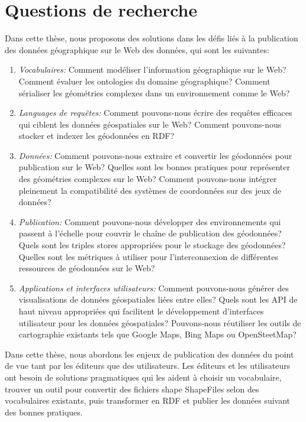 \documentclass[a4paper,11pt,twoside]{report}
\begin{document}
\chapter*{Questions de recherche}

Dans cette thèse, nous proposons des solutions dans les défis liés à la publication des données géographique sur le Web des données, qui sont les suivantes: 

\begin{enumerate}

\item \textit{Vocabulaires:} Comment modéliser l'information géographique sur le Web? Comment évaluer les ontologies du domaine géographique? Comment sérialiser les géométries complexes dans un environnement comme le Web? 
\item \textit{Languages de requêtes:} Comment pouvons-nous écrire des requêtes efficaces qui ciblent les données géospatiales sur le Web? Comment pouvons-nous stocker et indexer les géodonnées en RDF?

\item \textit{Données:} Comment pouvons-nous extraire et convertir les géodonnées pour publication sur le Web? Quelles sont les bonnes pratiques pour représenter des géométries complexes sur le Web? Comment pouvons-nous intégrer pleinement la compatibilité des systèmes de coordonnées  sur des jeux de données?

\item \textit{Publication:} Comment pouvons-nous développer des environnements qui passent à l'échelle pour couvrir le chaîne de publication des géodonnées? Quels sont les triples stores appropriées pour le stockage des géodonnées? Quelles sont les métriques à utiliser pour l'interconnexion de différentes ressources de géodonnées sur le Web? 

\item \textit{Applications et interfaces utilisateurs:} 
Comment pouvons-nous générer des visualisations de données géospatiales liées entre elles? Quels sont les API de haut niveau appropriées qui facilitent le développement d'interfaces utilisateur pour les données géospatiales? Pouvons-nous réutiliser les outils de cartographie existants tels que Google Maps, Bing Maps ou OpenSteetMap?

\end{enumerate}


Dans cette thèse, nous abordons les enjeux de publication des données du point de vue tant par les éditeurs que des utilisateurs. Les éditeurs et les utilisateurs ont besoin de solutions pragmatiques qui les aident à choisir un vocabulaire, trouver un outil pour convertir des fichiers shape  ShapeFiles selon des vocabulaires existants, puis transformer en RDF et publier les données suivant des bonnes pratiques.
\end{document}
